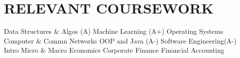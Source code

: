 \documentclass[]{deedy-resume-openfont}
\begin{document}
\begin{minipage}[t]{0.64\textwidth}
\section{RELEVANT COURSEWORK}
Data Structures & Algos (A) \textbullet{} Machine Learning (A+) \textbullet{} Operating Systems \textbullet{} Computer \& Commn Networks  \textbullet{}  OOP and Java (A-) \textbullet{} Software Engineering(A-) \\
\vspace{1 mm}
Intro Micro \& Macro Economics \textbullet{}   Corporate Finance \textbullet{} Financial Accounting  

\sectionsep




\end{minipage} 
\end{document}

